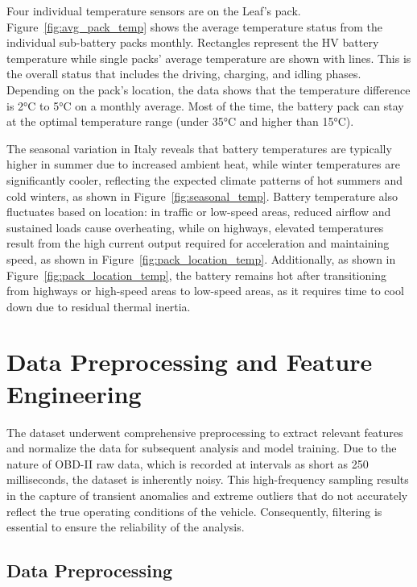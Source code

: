 Four individual temperature sensors are on the Leaf's pack. 
Figure~\ref{fig:avg_pack_temp} shows the average temperature status from the individual sub-battery packs monthly. 
Rectangles represent the \gls{HV} battery temperature while single packs' average temperature are shown with lines. 
This is the overall status that includes the driving, charging, and idling phases. 
Depending on the pack's location, the data shows that the temperature difference is 2°C to 5°C on a monthly average. 
Most of the time, the battery pack can stay at the optimal temperature range (under 35°C and higher than 15°C).

The seasonal variation in Italy reveals that battery temperatures are typically higher in summer due to increased ambient heat, 
while winter temperatures are significantly cooler, reflecting the expected climate patterns of hot summers and cold winters, as shown in Figure~\ref{fig:seasonal_temp}.
Battery temperature also fluctuates based on location: 
in traffic or low-speed areas, reduced airflow and sustained loads cause overheating, 
while on highways, elevated temperatures result from the high current output required for acceleration and maintaining speed, as shown in Figure~\ref{fig:pack_location_temp}.
Additionally, as shown in Figure~\ref{fig:pack_location_temp}, 
the battery remains hot after transitioning from highways or high-speed areas to low-speed areas, as it requires time to cool down due to residual thermal inertia.


\section{Data Preprocessing and Feature Engineering}

The dataset underwent comprehensive preprocessing to extract relevant features and normalize the data for subsequent analysis and model training. 
Due to the nature of \gls{OBD-II} raw data, which is recorded at intervals as short as 250 milliseconds, the dataset is inherently noisy. 
This high-frequency sampling results in the capture of transient anomalies and extreme outliers that do not accurately reflect the true operating conditions of the vehicle. 
Consequently, filtering is essential to ensure the reliability of the analysis.

\subsection{Data Preprocessing}

